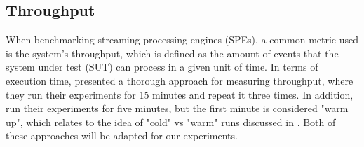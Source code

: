 \subsection{Throughput}\label{sec:throughput}
When benchmarking streaming processing engines (SPEs), a common metric used is the system's throughput, which is defined as the amount of events that the system under test (SUT) can process in a given unit of time. In terms of execution time, \citeauthor{henningShuffleBenchBenchmarkLargeScale2024} \cite{henningShuffleBenchBenchmarkLargeScale2024} presented a thorough approach for measuring throughput, where they run their experiments for 15 minutes and repeat it three times. In addition, \citeauthor{henningTheodoliteScalabilityBenchmarking2021} \cite{henningTheodoliteScalabilityBenchmarking2021} run their experiments for five minutes, but the first minute is considered "warm up", which relates to the idea of "cold" vs "warm" runs discussed in \cite{raasveldtFairBenchmarkingConsidered2018}. Both of these approaches will be adapted for our experiments.







